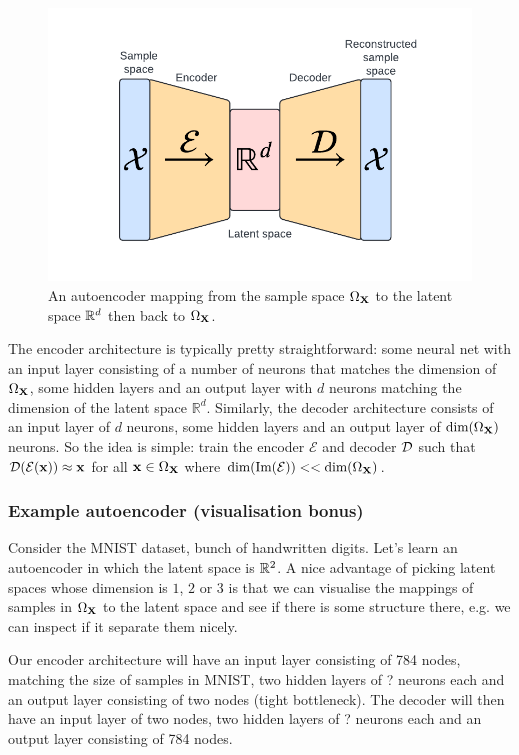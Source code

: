 \documentclass[11pt]{article}
\begin{document}
\begin{figure}[ht]
    \centering
    \includegraphics{./figures/neural_nets/autoencoder.pdf}
    \caption{\centering An autoencoder mapping from the sample space $\Omega_{\mathbf{X}}$ to the latent space $\mathbb{R}^d$ then back to $\Omega_{\mathbf{X}}$.}
    \label{fig:autoencoder}
\end{figure}

The encoder architecture is typically pretty straightforward: some neural net with an input layer consisting of a number of neurons that matches the dimension of $\Omega_{\mathbf{X}}$, some hidden layers and an output layer with $d$ neurons matching the dimension of the latent space $\mathbb{R}^d$. Similarly, the decoder architecture consists of an input layer of $d$ neurons, some hidden layers and an output layer of $\text{dim}(\Omega_{\mathbf{X}})$ neurons. So the idea is simple: train the encoder $\mathcal{E}$ and decoder $\mathcal{D}$ such that $\mathcal{D}(\mathcal{E}(\mathbf{x}))\approx\mathbf{x}$ for all $\mathbf{x}\in\Omega_{\mathbf{X}}$ where $\text{dim}(\text{Im}(\mathcal{E}))<<\text{dim}(\Omega_{\mathbf{X}})$.

\subsubsection{Example autoencoder (visualisation bonus)}
Consider the MNIST dataset, bunch of handwritten digits. Let's learn an autoencoder in which the latent space is $\mathbb{R}^2$. A nice advantage of picking latent spaces whose dimension is $1$, $2$ or $3$ is that we can visualise the mappings of samples in $\Omega_{\mathbf{X}}$ to the latent space and see if there is some structure there, e.g. we can inspect if it separate them nicely.

Our encoder architecture will have an input layer consisting of 784 nodes, matching the size of samples in MNIST, two hidden layers of ? neurons each and an output layer consisting of two nodes (tight bottleneck). The decoder will then have an input layer of two nodes, two hidden layers of ? neurons each and an output layer consisting of 784 nodes.
\end{document}
